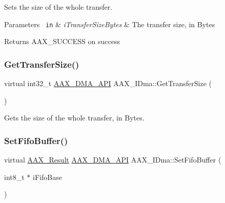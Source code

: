 Sets the size of the whole transfer. 


\begin{DoxyParams}[1]{Parameters}
\mbox{\texttt{ in}}  & {\em i\+Transfer\+Size\+Bytes} & The transfer size, in Bytes\\
\hline
\end{DoxyParams}
\begin{DoxyReturn}{Returns}
{\ttfamily A\+A\+X\+\_\+\+S\+U\+C\+C\+E\+SS} on success 
\end{DoxyReturn}
\mbox{\label{a01809_a3cd20d341b8b592d259716768a03a88a}} 
\subsubsection{\texorpdfstring{GetTransferSize()}{GetTransferSize()}}
{\footnotesize\ttfamily virtual int32\+\_\+t \mbox{\hyperlink{a00587_acae60d01e5e4bd3282369d0d9d378f3f}{A\+A\+X\+\_\+\+D\+M\+A\+\_\+\+A\+PI}} A\+A\+X\+\_\+\+I\+Dma\+::\+Get\+Transfer\+Size (\begin{DoxyParamCaption}{ }\end{DoxyParamCaption})\hspace{0.3cm}{\ttfamily [pure virtual]}}



Gets the size of the whole transfer, in Bytes. 

\mbox{\label{a01809_afeda3af6b2c5da7a8b2759aa9429c7dc}} 
\subsubsection{\texorpdfstring{SetFifoBuffer()}{SetFifoBuffer()}}
{\footnotesize\ttfamily virtual \mbox{\hyperlink{a00392_a4d8f69a697df7f70c3a8e9b8ee130d2f}{A\+A\+X\+\_\+\+Result}} \mbox{\hyperlink{a00587_acae60d01e5e4bd3282369d0d9d378f3f}{A\+A\+X\+\_\+\+D\+M\+A\+\_\+\+A\+PI}} A\+A\+X\+\_\+\+I\+Dma\+::\+Set\+Fifo\+Buffer (\begin{DoxyParamCaption}\item[{int8\+\_\+t $\ast$}]{i\+Fifo\+Base }\end{DoxyParamCaption})\hspace{0.3cm}{\ttfamily [pure virtual]}}



